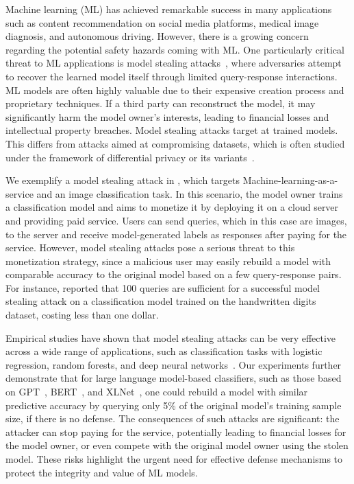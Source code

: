 
    Machine learning (ML) has achieved remarkable success in many applications such as content recommendation on social media platforms, medical image diagnosis, and autonomous driving. However, there is a growing concern regarding the potential safety hazards coming with ML. One particularly critical threat to ML applications is model stealing attacks~\citep{tramer2016stealing, oliynyk2023know}, where adversaries attempt to recover the learned model itself through limited query-response interactions. ML models are often highly valuable due to their expensive creation process and proprietary techniques. If a third party can reconstruct the model, it may significantly harm the model owner's interests, leading to financial losses and intellectual property breaches. Model stealing attacks target at trained models. This differs from attacks aimed at compromising datasets, which is often studied under the framework of differential privacy or its variants~\citep[see, e.g.,][]{evfimievski2003limiting, dwork2006calibrating, dong2022gaussian}.

    We exemplify a model stealing attack in , which targets Machine-learning-as-a-service and an image classification task. In this scenario, the model owner trains a classification model and aims to monetize it by deploying it on a cloud server and providing paid service. Users can send queries, which in this case are images, to the server and receive model-generated labels as responses after paying for the service. However, model stealing attacks pose a serious threat to this monetization strategy, since a malicious user may easily rebuild a model with comparable accuracy to the original model based on a few query-response pairs. For instance, \citet{tramer2016stealing} reported that 100 queries are sufficient for a successful model stealing attack on a classification model trained on the handwritten digits dataset, costing less than one dollar. 
    
    Empirical studies have shown that model stealing attacks can be very effective across a wide range of applications, such as classification tasks with logistic regression, random forests, and deep neural networks~\citep{tramer2016stealing,papernot2016practical, orekondy2019knockoff}. Our experiments further demonstrate that for large language model-based classifiers, such as those based on GPT~\citep{radford2018improving}, BERT~\citep{devlin2018bert}, and XLNet~\citep{yang2019xlnet}, one could rebuild a model with similar predictive accuracy by querying only 5\% of the original model's training sample size, if there is no defense. The consequences of such attacks are significant: the attacker can stop paying for the service, potentially leading to financial losses for the model owner, or even compete with the original model owner using the stolen model. These risks highlight the urgent need for effective defense mechanisms to protect the integrity and value of ML models.

